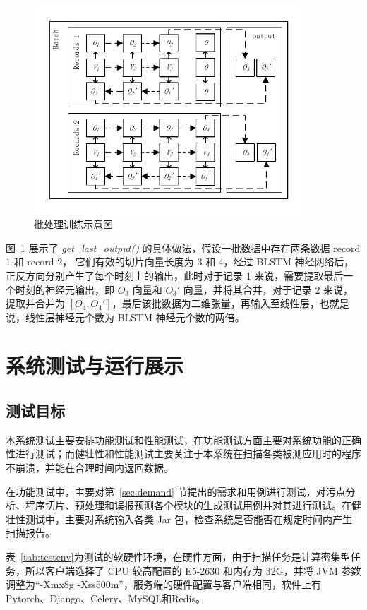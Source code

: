 \begin{figure}[!htb]
    \centering
    \includegraphics[width=0.9\textwidth]{FIGs/chapter4/blstmFoward.pdf}
    \caption{批处理训练示意图}\label{blstmForward}
\end{figure}

图~\ref{blstmForward} 展示了 \textit{get\_last\_output()} 的具体做法，假设一批数据中存在两条数据 record 1 和 record 2， 它们有效的切片向量长度为 3 和 4，经过 BLSTM 神经网络后，正反方向分别产生了每个时刻上的输出，此时对于记录 1 来说，需要提取最后一个时刻的神经元输出，即 $O_3$ 向量和 $O_3'$ 向量，并将其合并，对于记录 2 来说，提取并合并为 $\left[O_{4}, O_{4}'\right]$，最后该批数据为二维张量，再输入至线性层，也就是说，线性层神经元个数为 BLSTM 神经元个数的两倍。

\section{系统测试与运行展示}
\subsection{测试目标}
本系统测试主要安排功能测试和性能测试，在功能测试方面主要对系统功能的正确性进行测试；而健壮性和性能测试主要关注于本系统在扫描各类被测应用时的程序不崩溃，并能在合理时间内返回数据。

在功能测试中，主要对第~\ref{sec:demand} 节提出的需求和用例进行测试，对污点分析、程序切片、预处理和误报预测各个模块的生成测试用例并对其进行测试。在健壮性测试中，主要对系统输入各类 Jar 包，检查系统是否能否在规定时间内产生扫描报告。

表~\ref{tab:testenv}为测试的软硬件环境，在硬件方面，由于扫描任务是计算密集型任务，所以客户端选择了 CPU 较高配置的 E5-2630 和内存为 32G，并将 JVM 参数调整为“-Xmx8g -Xss500m”，服务端的硬件配置与客户端相同，软件上有Pytorch、Django、Celery、MySQL和Redis。

